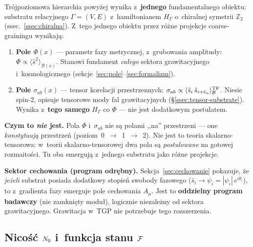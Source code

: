 \begin{remark}\label{rem:jeden-substrat}
Tr\'ojpoziomowa hierarchia powy\.zej wynika z~\textbf{jednego}
fundamentalnego obiektu: substratu relacyjnego $\Gamma = (V,E)$
z~hamiltonianem $H_\Gamma$ o~chiralnej symetrii $\mathbb{Z}_2$
(ssec.~\ref{ssec:chiralna}). Z~tego jednego obiektu
przez r\'o\.zne projekcje coarse-grainingu wynikaj\k{a}:

\begin{enumerate}[nosep]
  \item \textbf{Pole $\Phi(x)$} --- parametr fazy metrycznej,
    z~grubowania amplitudy: $\Phi \propto \langle\hat{s}^2\rangle_{\mathcal{B}(x)}$.
    Stanowi fundament \emph{ca\l{}ego} sektora grawitacyjnego
    i~kosmologicznego (sekcje~\ref{sec:pole}--\ref{sec:formalizm}).
  \item \textbf{Pole $\sigma_{ab}(x)$} --- tensor korelacji przestrzennych:
    $\sigma_{ab} \propto \langle\hat{s}_i\,\hat{s}_{i+\hat{e}_a}\rangle_{\mathcal{B}}^{\rm TF}$.
    Niesie spin-2, opisuje tensorowe mody fal grawitacyjnych
    (\S\ref{ssec:tensor-substrate}).
    Wynika z~\textbf{tego samego} $H_\Gamma$ co $\Phi$ ---
    nie jest dodatkowym postulatem.
\end{enumerate}

\noindent\textbf{Czym to \emph{nie} jest.}
Pola $\Phi$ i~$\sigma_{ab}$ nie s\k{a} polami ,,na'' przestrzeni ---
one \emph{konstytuuj\k{a}} przestrze\'n (poziom~0~$\to$~1~$\to$~2).
Nie jest to teoria skalarno-tensorowa: w~teorii skalarno-tensorowej
dwa pola s\k{a} \emph{postulowane} na gotowej rozmaito\'sci.
Tu oba emerguj\k{a} z~jednego substratu jako r\'o\.zne projekcje.

\medskip
\noindent\textbf{Sektor cechowania (program odrębny).}
Sekcja~\ref{sec:cechowanie} pokazuje, \.ze \emph{je\.zeli} substrat
posiada dodatkowy stopie\'n swobody fazowego
($\hat{s}_i \to \psi_i = |\psi_i|\,e^{i\theta_i}$),
to z~gradienta fazy emerguje pole cechowania $A_\mu$.
Jest to \textbf{oddzielny program badawczy} (nie zamkni\k{e}ty modu\l{}),
logicznie niezale\.zny od sektora grawitacyjnego.
Grawitacja w~TGP nie potrzebuje tego rozszerzenia.
\end{remark}

\subsection{Nico\'s\'c $N_0$ i~funkcja stanu $\mathcal{F}$}\label{ssec:N0}

